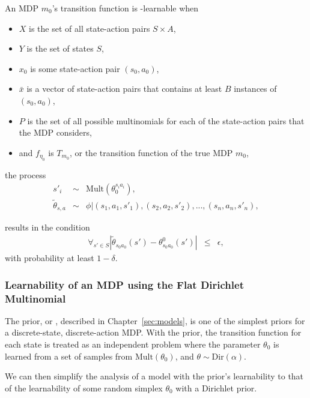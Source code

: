 An MDP $m_0$'s transition function is \bed-learnable when
\begin{itemize}
\item $X$ is the set of all state-action pairs $S\times A$,
\item $Y$ is the set of states $S$,
\item $x_0$ is some state-action pair $(s_0, a_0)$,
\item $\bar x$ is a vector of state-action pairs that contains at least $B$ instances of $(s_0,a_0)$,
\item $P$ is the set of all possible multinomials for each of the state-action pairs that the MDP considers, 
\item and $f_{\eta_0}$ is $T_{m_0}$, or the transition function of the true MDP $m_0$,
\end{itemize}
the process
\begin{eqnarray}
s'_i &\sim& \mbox{Mult}(\theta_0^{s_i a_i}),\\
\tilde \theta_{s,a} &\sim& \phi|(s_1,a_1,s'_1),(s_2,a_2,s'_2),...,(s_n,a_n,s'_n),
\end{eqnarray}


results in the condition
\begin{eqnarray}
\forall_{s'\in S} |\tilde\theta_{s_0 a_0}(s') - \theta^0_{s_0 a_0}(s')| & \leq & \epsilon,
\end{eqnarray}
with probability at least $1-\delta$.


\subsubsection{Learnability of an MDP using the Flat Dirichlet Multinomial}

The  prior, or , described in Chapter~\ref{sec:models}, is one of the simplest priors for a discrete-state, discrete-action MDP. With the  prior, the transition function for each state is treated as an independent problem where the parameter $\theta_0$ is learned from a set of samples from $\mbox{Mult}(\theta_0)$, and $\theta \sim \mbox{Dir}(\alpha)$.

We can then simplify the analysis of a model with the  prior's learnability to that of the learnability of some random simplex $\theta_0$ with a Dirichlet prior.

